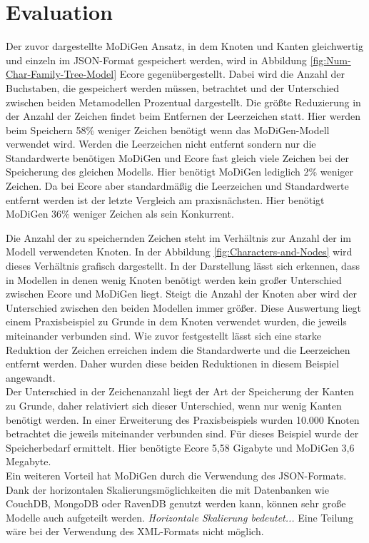 \section{Evaluation} \label{sec:evaluation}
Der zuvor dargestellte MoDiGen Ansatz, in dem Knoten und Kanten gleichwertig und einzeln im JSON-Format gespeichert werden, wird in Abbildung \ref{fig:Num-Char-Family-Tree-Model} Ecore gegenübergestellt. Dabei wird die Anzahl der Buchstaben, die gespeichert werden müssen, betrachtet und der Unterschied zwischen beiden Metamodellen Prozentual dargestellt. Die größte Reduzierung in der Anzahl der Zeichen findet beim Entfernen der Leerzeichen statt. Hier werden beim Speichern 58\% weniger Zeichen benötigt wenn das MoDiGen-Modell verwendet wird. Werden die Leerzeichen nicht entfernt sondern nur die Standardwerte benötigen MoDiGen und Ecore fast gleich viele Zeichen bei der Speicherung des gleichen Modells. Hier benötigt MoDiGen lediglich 2\% weniger Zeichen. Da bei Ecore aber standardmäßig die Leerzeichen und Standardwerte entfernt werden ist der letzte Vergleich am praxisnächsten. Hier benötigt MoDiGen 36\% weniger Zeichen als sein Konkurrent.

Die Anzahl der zu speichernden Zeichen steht im Verhältnis zur Anzahl der im Modell verwendeten Knoten. 
In der Abbildung \ref{fig:Characters-and-Nodes} wird dieses Verhältnis grafisch dargestellt. In der Darstellung lässt sich erkennen, dass in Modellen in denen wenig Knoten benötigt werden kein großer Unterschied zwischen Ecore und MoDiGen liegt. Steigt die Anzahl der Knoten aber wird der Unterschied zwischen den beiden Modellen immer größer. Diese Auswertung liegt einem Praxisbeispiel zu Grunde in dem Knoten verwendet wurden, die jeweils miteinander verbunden sind. Wie zuvor festgestellt lässt sich eine starke Reduktion der Zeichen erreichen indem die Standardwerte und die Leerzeichen entfernt werden. Daher wurden diese beiden Reduktionen in diesem Beispiel angewandt.\\
Der Unterschied in der Zeichenanzahl liegt der Art der Speicherung der Kanten zu Grunde, daher relativiert sich dieser Unterschied, wenn nur wenig Kanten benötigt werden. In einer Erweiterung des Praxisbeispiels wurden 10.000 Knoten betrachtet die jeweils miteinander verbunden sind. Für dieses Beispiel wurde der Speicherbedarf ermittelt. Hier benötigte Ecore 5,58 Gigabyte und MoDiGen 3,6 Megabyte.\\
Ein weiteren Vorteil hat MoDiGen durch die Verwendung des JSON-Formats. Dank der horizontalen Skalierungsmöglichkeiten die mit Datenbanken wie CouchDB, MongoDB oder RavenDB genutzt werden kann, können sehr große Modelle auch aufgeteilt werden. \textit{Horizontale Skalierung bedeutet...} Eine Teilung wäre bei der Verwendung des XML-Formats nicht möglich. 



